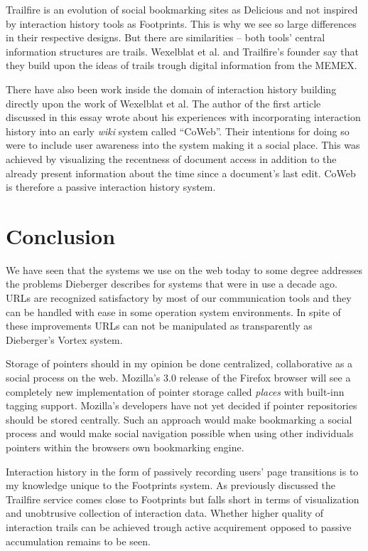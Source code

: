 \documentclass[12pt,a4paper]{article}
\begin{document}
Trailfire is an evolution of social bookmarking sites as Delicious and not
inspired by interaction history tools as Footprints. This is why we see so
large differences in their respective designs. But there are similarities --
both tools' central information structures are trails. Wexelblat et al. and
Trailfire's founder\cite{ohalloran07} say that they build upon the ideas of
trails trough digital information from the MEMEX\cite{bush45}.

There have also been work inside the domain of interaction history building
directly upon the work of Wexelblat et al. The author of the first article
discussed in this essay wrote\cite{dieberger00} about his experiences with
incorporating interaction history into an early \emph{wiki} system called
``CoWeb''. Their intentions for doing so were to include user awareness into
the system making it a social place. This was achieved by visualizing the
recentness of document access in addition to the already present information
about the time since a document's last edit. CoWeb is therefore a passive
interaction history system.

\section{Conclusion}

We have seen that the systems we use on the web today to some degree addresses
the problems Dieberger describes for systems that were in use a decade ago.
URLs are recognized satisfactory by most of our communication tools and they
can be handled with ease in some operation system environments. In spite of
these improvements URLs can not be manipulated as transparently as Dieberger's
Vortex system.

Storage of pointers should in my opinion be done
centralized, collaborative as a social  process on the web. Mozilla's 3.0
release of the Firefox browser will see a completely new implementation of
pointer storage called \emph{places}\cite{places07} with built-inn tagging
support. Mozilla's developers have not yet decided if pointer repositories
should be stored centrally. Such an approach would make bookmarking a social
process and would make social navigation possible when using other
individuals pointers within the browsers own bookmarking engine.

Interaction history in the form of passively recording users' page transitions
is to my knowledge unique to the Footprints system. As previously discussed
the Trailfire service comes close to Footprints but falls short in terms of
visualization and unobtrusive collection of interaction data. Whether higher
quality of interaction trails can be achieved trough active acquirement
opposed to passive accumulation remains to be seen.

\section{}




\end{document}
